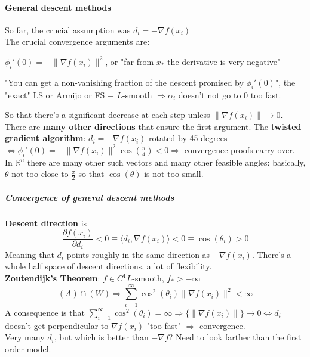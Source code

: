 \documentclass[10pt]{report}
\begin{document}
\paragraph{General descent methods} So far, the crucial assumption was $d_i = -\nabla f(x_i)$\\
The crucial convergence arguments are:
\begin{list}{}{}
	\item $\phi_i'(0) = -\|\nabla f(x_i)\|^2$, or "far from $x_*$ the derivative is very negative"
	\item "You can get a non-vanishing fraction of the descent promised by $\phi_i'(0)$", the "exact" LS or Armijo or FS + $L$-smooth $\Rightarrow \alpha_i$ doesn't not go to 0 too fast.
\end{list}
So that there's a significant decrease at each step unless $\|\nabla f(x_i)\|\rightarrow 0$.\\
There are \textbf{many other directions} that ensure the first argument. The \textbf{twisted gradient algorithm}: $d_i = -\nabla f(x_i)$ rotated by 45 degrees $\Leftrightarrow \phi_i'(0) = -\|\nabla f(x_i)\|^2\cos(\frac{\pi}{4}) < 0 \Rightarrow$ convergence proofs carry over.\\
In $\mathbb{R}^n$ there are many other such vectors and many other feasible angles: basically, $\theta$ not too close to $\frac{\pi}{2}$ so that $\cos(\theta)$ is not too small.
\subparagraph{Convergence of general descent methods} \textbf{Descent direction} is $$\frac{\partial f(x_i)}{\partial d_i} < 0 \equiv \langle d_i,\nabla f(x_i)\rangle < 0 \equiv \cos(\theta_i) > 0$$ Meaning that $d_i$ points roughly in the same direction as $-\nabla f(x_i)$. There's a whole half space of descent directions, a lot of flexibility.\\
\textbf{Zoutendijk's Theorem}: $f\in C^1 L$-smooth, $f_*>-\infty$ $$(A)\cap(W)\Rightarrow\sum_{i=1}^\infty\cos^2(\theta_i)\|\nabla f(x_i)\|^2<\infty$$
A consequence is that $\sum_{i=1}^\infty\cos^2(\theta_i) = \infty \Rightarrow \{\|\nabla f(x_i)\|\}\rightarrow 0 \Leftrightarrow d_i$ doesn't get perpendicular to $\nabla f(x_i)$ "too fast" $\Rightarrow$ convergence.\\
Very many $d_i$, but which is better than $-\nabla f$? Need to look farther than the first order model.
\end{document}
